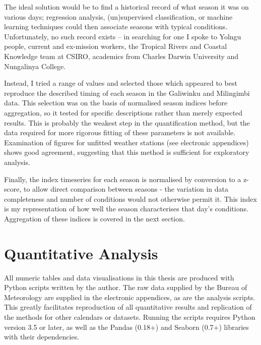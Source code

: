 The ideal solution would be to find a historical record of what season
it was on various days; regression analysis, (un)supervised classification,
or machine learning techniques could then associate seasons with typical
conditions.  Unfortunately, no such record exists -- in searching for one
I spoke to Yolngu people, current and ex-mission workers, the Tropical
Rivers and Coastal Knowledge team at CSIRO, academics from Charles Darwin
University and Nungalinya College.

Instead, I tried a range of values and selected those which appeared to
best reproduce the described timing of each season in the Galiwinku and
Milingimbi data.  This selection was on the basis of normalised season
indices before aggregation, so it tested for specific descriptions
rather than merely expected results.
%
This is probably the weakest step in the quantification method, but the data
required for more rigorous fitting of these parameters is not available.
Examination of figures for unfitted weather stations (see electronic appendices)
shows good agreement, suggesting that this method is sufficient for exploratory
analysis.

Finally, the index timeseries for each season is normalised by conversion to
a z-score, to allow direct comparison between seasons - the variation in data
completeness and number of conditions would not otherwise permit it.
This index is my representation of how well the season characterises that day's
conditions.  Aggregation of these indices is covered in the next section.



\section{Quantitative Analysis}

All numeric tables and data visualisations in this thesis are produced
with Python scripts written by the author.  The raw data supplied by the
Bureau of Meteorology are supplied in the electronic appendices, as
are the analysis scripts.  This greatly facilitates reproduction of all
quantitative results and replication of the methods for other calendars
or datasets.  Running the scripts requires Python version 3.5 or later,
as well as the Pandas (0.18+) and Seaborn (0.7+) libraries with their
dependencies.

